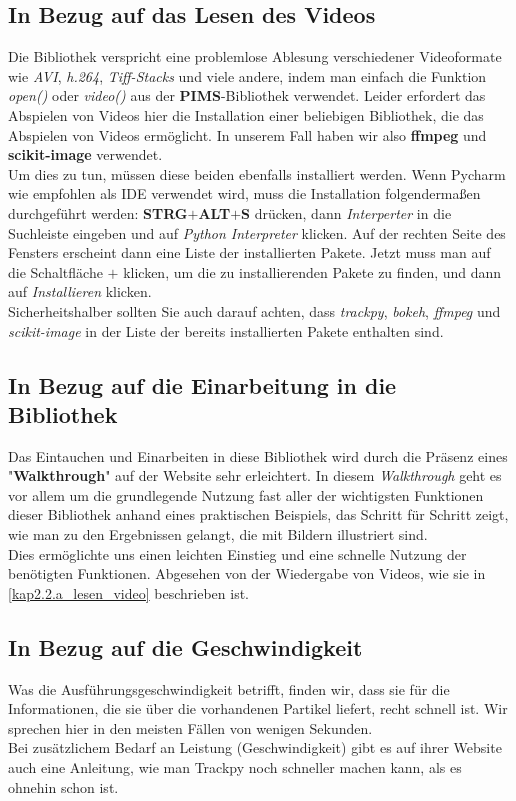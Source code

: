 \subsection{In Bezug auf das Lesen des Videos \label{kap2.2.a_lesen_video}}
Die Bibliothek verspricht eine problemlose Ablesung verschiedener Videoformate wie \textit{AVI}, \textit{h.264}, \textit{Tiff-Stacks} und viele andere, indem man einfach die Funktion \textit{open()} oder \textit{video()} aus der \textbf{PIMS}-Bibliothek \cite{pims} verwendet. Leider erfordert das Abspielen von Videos hier die Installation einer beliebigen Bibliothek, die das Abspielen von Videos ermöglicht. In unserem Fall haben wir also \textbf{ffmpeg} und \textbf{scikit-image} verwendet.\\
Um dies zu tun, müssen diese beiden ebenfalls installiert werden. Wenn Pycharm wie empfohlen als IDE verwendet wird, muss die Installation folgendermaßen durchgeführt werden:  \textbf{STRG$+$ALT$+$S} drücken, dann \textit{Interperter} in die Suchleiste eingeben und  auf \textit{Python Interpreter} klicken. 
Auf der rechten Seite des Fensters erscheint dann eine Liste der installierten Pakete. Jetzt muss man auf die Schaltfläche $+$ klicken, um die zu installierenden Pakete zu finden, und dann auf \textit{Installieren} klicken.\\
Sicherheitshalber sollten Sie auch darauf achten, dass \textit{trackpy}, \textit{bokeh}, \textit{ffmpeg} und \textit{scikit-image} in der Liste der bereits installierten Pakete enthalten sind. 

\subsection{In Bezug auf die Einarbeitung in die Bibliothek \label{kap2.2.b_einarbeitung}}

Das Eintauchen und Einarbeiten in diese Bibliothek wird durch die Präsenz eines "\textbf{Walkthrough}" auf der Website sehr erleichtert.  In diesem \textit{Walkthrough} geht es vor allem um die grundlegende Nutzung fast aller der wichtigsten Funktionen dieser Bibliothek anhand eines praktischen Beispiels, das Schritt für Schritt zeigt, wie man zu den Ergebnissen gelangt, die mit Bildern illustriert sind.\\
Dies ermöglichte uns einen leichten Einstieg und eine schnelle Nutzung der benötigten Funktionen. Abgesehen von der Wiedergabe von Videos, wie sie in \ref{kap2.2.a_lesen_video} beschrieben ist.


\subsection{In Bezug auf die Geschwindigkeit \label{kap2.2.c_geschwindigkeit}}
Was die Ausführungsgeschwindigkeit betrifft, finden wir, dass sie für die Informationen, die sie über die vorhandenen Partikel liefert, recht schnell ist.  Wir sprechen hier in den meisten Fällen von wenigen Sekunden. \\
Bei zusätzlichem Bedarf an Leistung (Geschwindigkeit) gibt es auf ihrer Website auch eine Anleitung, wie man Trackpy noch schneller machen kann, als es ohnehin schon ist.


